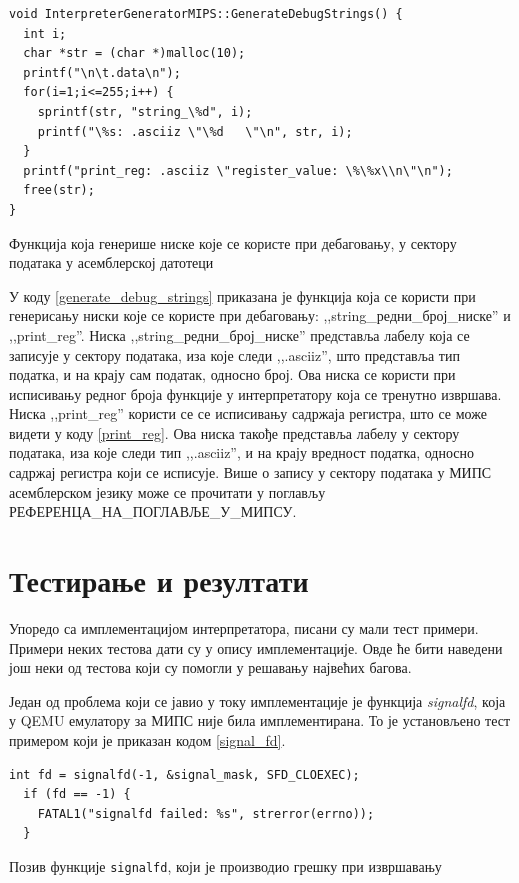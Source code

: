 \documentclass[12pt,oneside]{memoir}
\begin{document}
\begin{listing}
\begin{verbatim}
void InterpreterGeneratorMIPS::GenerateDebugStrings() {
  int i;
  char *str = (char *)malloc(10);
  printf("\n\t.data\n");
  for(i=1;i<=255;i++) {
    sprintf(str, "string_\%d", i);
    printf("\%s: .asciiz \"\%d   \"\n", str, i);
  }
  printf("print_reg: .asciiz \"register_value: \%\%x\\n\"\n");
  free(str);
}
\end{verbatim}
\caption{Функција која генерише ниске које се користе при дебаговању, у сектору података у асемблерској датотеци }
\label{generate_debug_strings}
\end{listing}

У коду \ref{generate_debug_strings} приказана је функција која се користи при генерисању ниски које се користе при дебаговању: ,,string\_редни\_број\_ниске'' и ,,print\_reg''. Ниска  ,,string\_редни\_број\_ниске'' представља лабелу која се записује у сектору података, иза које следи ,,.asciiz'', што представља тип податка, и на крају сам податак, односно број. Ова ниска се користи при исписивању редног броја функције у интерпретатору која се тренутно извршава.
Ниска ,,print\_reg'' користи се се исписивању садржаја регистра, што се може видети у коду \ref{print_reg}. Ова ниска такође представља лабелу у сектору података, иза које следи тип ,,.asciiz'', и на крају вредност податка, односно садржај регистра који се исписује. Више о запису у сектору података у МИПС асемблерском језику може се прочитати у поглављу РЕФЕРЕНЦА\_НА\_ПОГЛАВЉЕ\_У\_МИПСУ.

\section{Тестирање и резултати}
Упоредо са имплементацијом интерпретатора, писани су мали тест примери. Примери неких тестова дати су у опису имплементације. Овде ће бити наведени још неки од тестова који су помогли у решавању највећих багова.

Један од проблема који се јавио у току имплементације је функција \textit{signalfd}, која у QEMU емулатору за МИПС није била имплементирана. То је установљено тест примером који је приказан кодом \ref{signal_fd}.\\

\begin{listing}
\begin{verbatim}
int fd = signalfd(-1, &signal_mask, SFD_CLOEXEC);
  if (fd == -1) {
    FATAL1("signalfd failed: %s", strerror(errno));
  }
\end{verbatim}
\caption{Позив функције \texttt{signalfd}, који је производио грешку при извршавању }
\label{signal_fd}
\end{listing}
\end{document}
